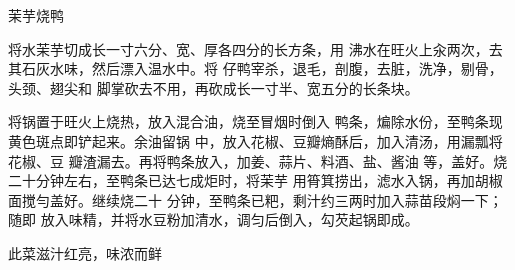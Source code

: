 \begin{recipe}{茉芋烧鸭}

\ingredients




\cooking

\step 	将水茉芋切成长一寸六分、宽、厚各四分的长方条，用 沸水在旺火上汆两次，去其石灰水味，然后漂入温水中。将 仔鸭宰杀，退毛，剖腹，去脏，洗净，剔骨，头颈、翅尖和 脚掌砍去不用，再砍成长一寸半、宽五分的长条块。

\step 	将锅置于旺火上烧热，放入混合油，烧至冒烟时倒入 鸭条，煸除水份，至鸭条现黄色斑点即铲起来。余油留锅 中，放入花椒、豆瓣熵酥后，加入清汤，用漏瓢将花椒、豆 瓣渣漏去。再将鸭条放入，加姜、蒜片、料酒、盐、酱油 等，盖好。烧二十分钟左右，至鸭条已达七成炬时，将茉芋 用筲箕捞出，滤水入锅，再加胡椒面搅勻盖好。继续烧二十 分钟，至鸭条已粑，剩汁约三两时加入蒜苗段焖一下；随即 放入味精，并将水豆粉加清水，调匀后倒入，勾芡起锅即成。

\notes

此菜滋汁红亮，味浓而鲜

\end{recipe}

